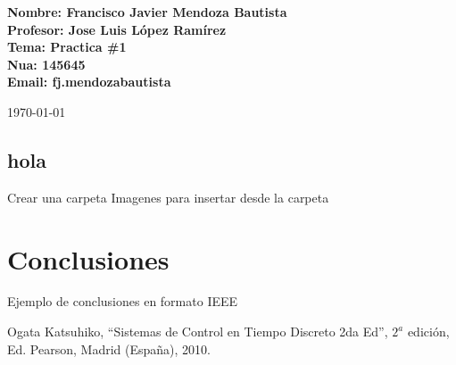 \documentclass[twocolumn,12pt]{article}
\newcommand{\espacio}[1]{\vspace*{#1\baselineskip}}
\newcommand{\sect}[1]{\begin{tcolorbox}[enhanced,frame style image=Imagenes/blueshade.png,opacityback=0.75,opacitybacktitle=0.25,colback=blue!5!white,colframe=blue!75!black,lifted shadow={1mm}{-2mm}{3mm}{0.1mm}{black!50!white}]
		\section{#1}
    \end{tcolorbox}}
\begin{document}
\begin{titlepage}
	    \begin{tcolorbox}
                 	\hspace{4.5cm}  \textbf{Nombre: \hspace{0.2cm}Francisco Javier Mendoza Bautista \vspace{0.2cm} 
					\\ \hspace{4.5cm} Profesor: \hspace{0.1cm}Jose Luis López Ramírez \vspace{0.2cm}
					\\ \hspace{4.5cm} Tema: \hspace{0.7cm}Practica \#1 \vspace{0.2cm}
					\\ \hspace{4.5cm} Nua: \hspace{0.9cm}145645 \vspace{0.2cm}
					\\ \hspace{4.5cm} Email: \hspace{0.6cm}fj.mendozabautista}     
        \end{tcolorbox}
	    \vfill 
        
		\begin{center}
         \today
		\end{center}
	    \end{titlepage}
     	\espacio{1}

		\sect{hola}
	    Crear una carpeta Imagenes para insertar desde la carpeta \\
        
		\section{Conclusiones}
		Ejemplo de conclusiones en formato IEEE
         
		\begin{center}
			\begin{thebibliography}{1}
	
				 
				 Ogata Katsuhiko, “Sistemas de Control en Tiempo Discreto 2da Ed”, $2^{a}$ edición, Ed. Pearson, Madrid (España), 2010.
	
			\end{thebibliography}
			
		\end{center}    
		
		
		

		

	
\end{document}
